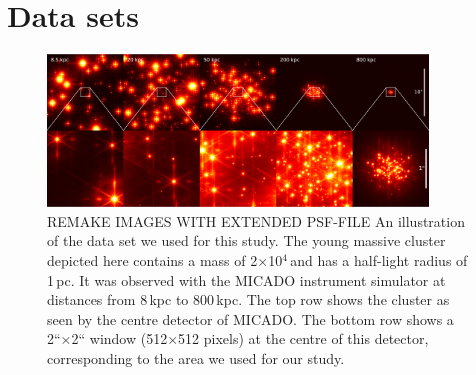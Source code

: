 \section{Data sets}
\label{sec:observations}


\begin{figure}

    \centering
    \includegraphics[width=0.9\textwidth]{images/5_clusters.pdf}

    \caption{\rewrite REMAKE IMAGES WITH EXTENDED PSF-FILE
    An illustration of the data set we used for this study. The young massive cluster depicted here contains a mass of 2$\times$10$^4$\,\msun and has a half-light radius of 1\,pc. It was observed with the MICADO instrument simulator at distances from 8\,kpc to 800\,kpc. The top row shows the cluster as seen by the centre detector of MICADO. The bottom row shows a 2``$\times$2`` window (512$\times$512 pixels) at the centre of this detector, corresponding to the area we used for our study.}
    
    \label{fig:5_clusters}
    
\end{figure}


